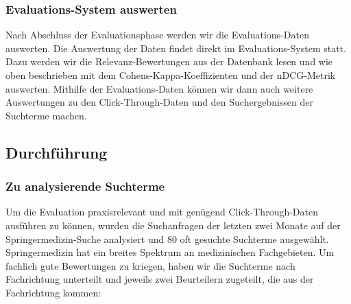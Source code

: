 \subsubsection{Evaluations-System auswerten}
\label{sec:Evaluation:Aufbau:Vorgehen:Auswerten}

Nach Abschluss der Evaluationsphase werden wir die Evaluations-Daten auswerten. Die Auswertung der Daten findet direkt im Evaluations-System statt. Dazu werden wir die Relevanz-Bewertungen aus der Datenbank lesen und wie oben beschrieben mit dem Cohens-Kappa-Koeffizienten und der nDCG-Metrik auswerten. Mithilfe der Evaluations-Daten können wir dann auch weitere Auswertungen zu den Click-Through-Daten und den Suchergebnissen der Suchterme machen.

\subsection{Durchführung}
\label{sec:Evaluation:Aufbau:Durchfuehrung}

\subsubsection{Zu analysierende Suchterme}
\label{sec:Evaluation:Aufbau:Durchfuehrung:Aufgabenstellung}

Um die Evaluation praxisrelevant und mit genügend Click-Through-Daten ausführen zu können, wurden die Suchanfragen der letzten zwei Monate auf der Springermedizin-Suche analysiert und 80 oft gesuchte Suchterme ausgewählt. Springermedizin hat ein breites Spektrum an medizinischen Fachgebieten. Um fachlich gute Bewertungen zu kriegen, haben wir die Suchterme nach Fachrichtung unterteilt und jeweils zwei Beurteilern zugeteilt, die aus der Fachrichtung kommen:

